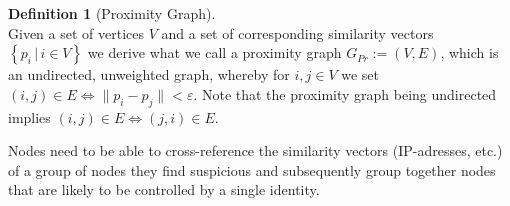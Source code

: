 \documentclass[11pt,a4paper]{article}
\theoremstyle{definition}
\newtheorem{definition}{Definition}[section]
\theoremstyle{theorem}
\theoremstyle{proposition}
\theoremstyle{corollary}
\theoremstyle{lemma}
\theoremstyle{example}
\theoremstyle{remark}
\begin{document}
\begin{definition}[Proximity Graph]\ \\
Given a set of vertices $V$ and a set of corresponding similarity vectors $\left\lbrace{}p_i\,|\,i\in{}V\right\rbrace$ we derive what we call a proximity graph $G_{Pr}:=(V,E)$, which is an undirected, unweighted graph, whereby for $i,j\in{}V$ we set $(i,j)\in{}E\Leftrightarrow\|p_i-p_j\|<\varepsilon$. Note that the proximity graph being undirected implies $(i,j)\in{}E\Leftrightarrow(j,i)\in{}E$.
\end{definition}

\noindent{}Nodes need to be able to cross-reference the similarity vectors (IP-adresses, etc.) of a group of nodes they find suspicious and subsequently group together nodes that are likely to be controlled by a single identity. 
\end{document}
